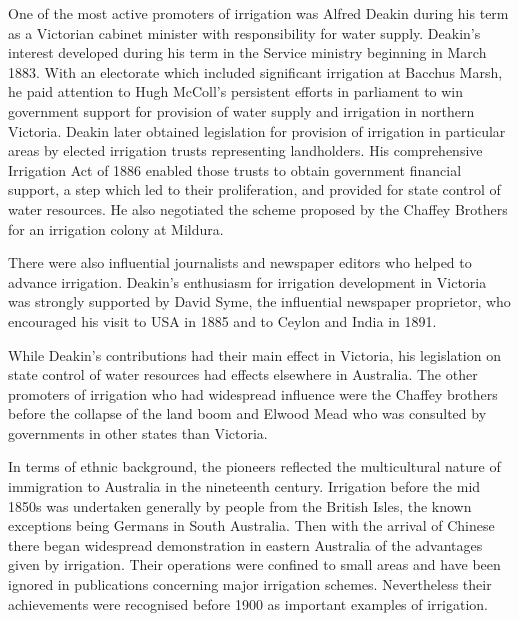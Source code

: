 One of the most active promoters of irrigation was Alfred Deakin
  during his term as a Victorian cabinet minister
with responsibility for water supply.  Deakin's interest developed
during his term in the Service ministry beginning in March 1883.  With
an electorate which included significant irrigation at Bacchus Marsh,
he paid attention to Hugh McColl's  persistent
efforts in parliament to win government support for provision of water
supply and irrigation in northern Victoria.  Deakin later obtained
legislation for provision of irrigation in particular areas by elected
irrigation trusts representing landholders.  His comprehensive
Irrigation Act of 1886 enabled those trusts to obtain government
financial support, a step which led to their proliferation, and
provided for state control of water resources.  He also negotiated the
scheme proposed by the Chaffey Brothers  for an
irrigation colony at Mildura.

There were also influential journalists and newspaper editors who
helped to advance irrigation. Deakin's enthusiasm for irrigation
development in Victoria was strongly supported by David Syme,
 the influential newspaper proprietor, who encouraged
his visit to USA in 1885 and to Ceylon and India in 1891.

While Deakin's contributions had their main effect in Victoria, his
legislation on state control of water resources had effects elsewhere
in Australia.  The other promoters of irrigation who had widespread
influence were the Chaffey brothers before the collapse of the land
boom and Elwood Mead  who was consulted by governments
in other states than Victoria.

In terms of ethnic background, the pioneers reflected the
multicultural nature of immigration to Australia in the nineteenth
century. Irrigation before the mid 1850s was undertaken generally by
people from the British Isles, the known exceptions being Germans
 in South Australia.  Then with the arrival of Chinese
 there began widespread demonstration in eastern
Australia of the advantages given by irrigation.  Their operations
were confined to small areas and have been ignored in publications
concerning major irrigation schemes. Nevertheless their achievements
were recognised before 1900 as important examples of irrigation.


